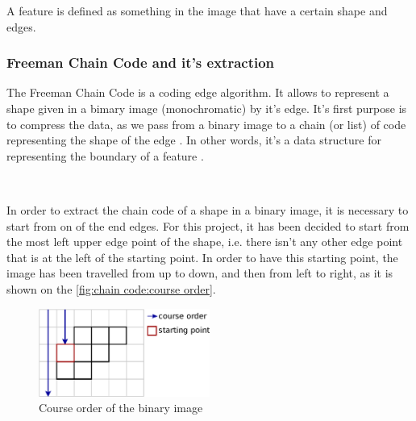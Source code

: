 A feature is defined as something in the image that have a certain shape and edges. 






\subsubsection{Freeman Chain Code and it's extraction}


The Freeman Chain Code is a coding edge algorithm. It allows to represent a shape given in a bimary image (monochromatic) by it's edge. It's first purpose is to compress the data, as we pass from a binary image to a chain (or list) of code representing the shape of the edge \cite{bib:chain:ParametreGeometriqueChaineFreeman}. In other words, it's a data structure for representing the boundary of a feature \cite{bib:chain:DigitalImageProcessing}.

~~

In order to extract the chain code of a shape in a binary image, it is necessary to start from on of the end edges. For this project, it has been decided to start from the most left upper edge point of the shape, i.e. there isn't any other edge point that is at the left of the starting point. In order to have this starting point, the image has been travelled from up to down, and then from left to right, as it is shown on the \vref{fig:chain code:course order}.


\begin{figure}[H]
	\centering
	\includegraphics[width=0.5\textwidth]{images/chain_code/course_order}
	\caption{Course order of the binary image \cite{bib:chain:ParametreGeometriqueChaineFreeman}}
	\label{fig:chain code:course order}	
\end{figure}

